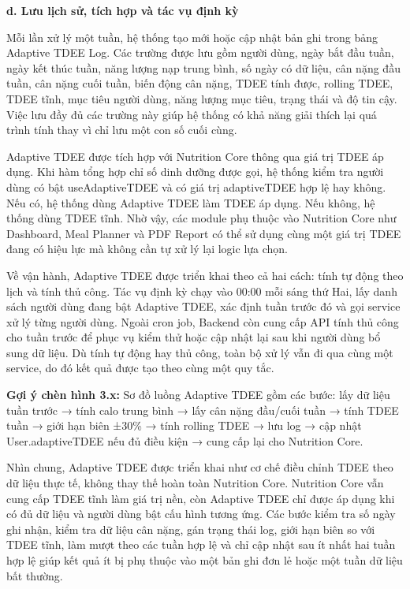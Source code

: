 \textbf{d. Lưu lịch sử, tích hợp và tác vụ định kỳ}

Mỗi lần xử lý một tuần, hệ thống tạo mới hoặc cập nhật bản ghi trong bảng Adaptive TDEE Log. Các trường được lưu gồm người dùng, ngày bắt đầu tuần, ngày kết thúc tuần, năng lượng nạp trung bình, số ngày có dữ liệu, cân nặng đầu tuần, cân nặng cuối tuần, biến động cân nặng, TDEE tính được, rolling TDEE, TDEE tĩnh, mục tiêu người dùng, năng lượng mục tiêu, trạng thái và độ tin cậy. Việc lưu đầy đủ các trường này giúp hệ thống có khả năng giải thích lại quá trình tính thay vì chỉ lưu một con số cuối cùng.

Adaptive TDEE được tích hợp với Nutrition Core thông qua giá trị TDEE áp dụng. Khi hàm tổng hợp chỉ số dinh dưỡng được gọi, hệ thống kiểm tra người dùng có bật useAdaptiveTDEE và có giá trị adaptiveTDEE hợp lệ hay không. Nếu có, hệ thống dùng Adaptive TDEE làm TDEE áp dụng. Nếu không, hệ thống dùng TDEE tĩnh. Nhờ vậy, các module phụ thuộc vào Nutrition Core như Dashboard, Meal Planner và PDF Report có thể sử dụng cùng một giá trị TDEE đang có hiệu lực mà không cần tự xử lý lại logic lựa chọn.

Về vận hành, Adaptive TDEE được triển khai theo cả hai cách: tính tự động theo lịch và tính thủ công. Tác vụ định kỳ chạy vào 00:00 mỗi sáng thứ Hai, lấy danh sách người dùng đang bật Adaptive TDEE, xác định tuần trước đó và gọi service xử lý từng người dùng. Ngoài cron job, Backend còn cung cấp API tính thủ công cho tuần trước để phục vụ kiểm thử hoặc cập nhật lại sau khi người dùng bổ sung dữ liệu. Dù tính tự động hay thủ công, toàn bộ xử lý vẫn đi qua cùng một service, do đó kết quả được tạo theo cùng một quy tắc.

\textbf{Gợi ý chèn hình 3.x:} Sơ đồ luồng Adaptive TDEE gồm các bước: lấy dữ liệu tuần trước → tính calo trung bình → lấy cân nặng đầu/cuối tuần → tính TDEE tuần → giới hạn biên ±30\% → tính rolling TDEE → lưu log → cập nhật User.adaptiveTDEE nếu đủ điều kiện → cung cấp lại cho Nutrition Core.

Nhìn chung, Adaptive TDEE được triển khai như cơ chế điều chỉnh TDEE theo dữ liệu thực tế, không thay thế hoàn toàn Nutrition Core. Nutrition Core vẫn cung cấp TDEE tĩnh làm giá trị nền, còn Adaptive TDEE chỉ được áp dụng khi có đủ dữ liệu và người dùng bật cấu hình tương ứng. Các bước kiểm tra số ngày ghi nhận, kiểm tra dữ liệu cân nặng, gán trạng thái log, giới hạn biên so với TDEE tĩnh, làm mượt theo các tuần hợp lệ và chỉ cập nhật sau ít nhất hai tuần hợp lệ giúp kết quả ít bị phụ thuộc vào một bản ghi đơn lẻ hoặc một tuần dữ liệu bất thường.

